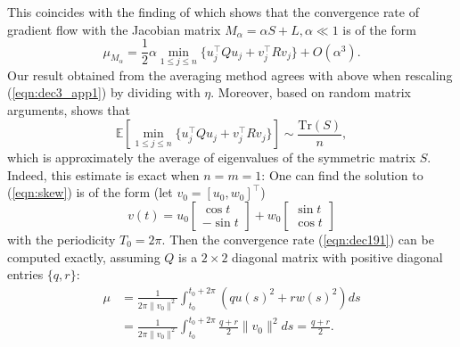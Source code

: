 \documentclass[11pt]{article}
\newcommand{\1}{\mathds{1}}
\newcommand{\E}{\mathbb{E}}
\begin{document}
        This coincides with the finding of \cite[Proposition 3.1]{wang2024local} which shows that the convergence rate of gradient flow with the Jacobian matrix $M_\alpha = \alpha S+L, \alpha\ll 1$ is of the form
        \begin{equation}
            \mu_{M_\alpha} = \frac{1}{2}\alpha \min_{1\leq j\leq n}\{ u_j^\top Q u_j+  v_j^\top R v_j \}+ O(\alpha^3).
        \end{equation}
        Our result obtained from the averaging method agrees with above when rescaling (\ref{eqn:dec3_app1}) by dividing with $\eta$. Moreover, based on random matrix arguments, \cite[Proposition 3.2]{wang2024local} shows that
\begin{equation}
    \E[\min_{1\leq j\leq n}\{ u_j^\top Q u_j+  v_j^\top R v_j \}]\sim \frac{\text{Tr}(S)}{n},
\end{equation}
which is approximately the average of eigenvalues of the symmetric matrix $S$. Indeed, this estimate is exact when $n=m=1$: One can find the solution to (\ref{eqn:skew}) is of the form (let $v_0= [u_0,w_0]^\top$)
\begin{equation*}
    v(t)= u_0\begin{bmatrix}
            \cos t\\
           -\sin t
        \end{bmatrix}+w_0\begin{bmatrix}
            \sin t\\
            \cos t
        \end{bmatrix}
\end{equation*}
with the periodicity $T_0=2\pi$. Then the convergence rate (\ref{eqn:dec191}) can be computed exactly, assuming $Q$ is a $2\times 2$ diagonal matrix with positive diagonal entries $\{q,r\}$:
\begin{equation*}
\begin{aligned}
    \mu&= \frac{1}{2\pi\|v_0\|^2} \int_{t_0}^{t_0+2\pi} ( qu(s)^2+  r w(s)^2) ds \\
    &= \frac{1}{2\pi\|v_0\|^2} \int_{t_0}^{t_0+2\pi}  \frac{q+r}{2} \|v_0\|^2ds = \frac{q+r}{2}.
    \end{aligned}
\end{equation*}
\end{document}
